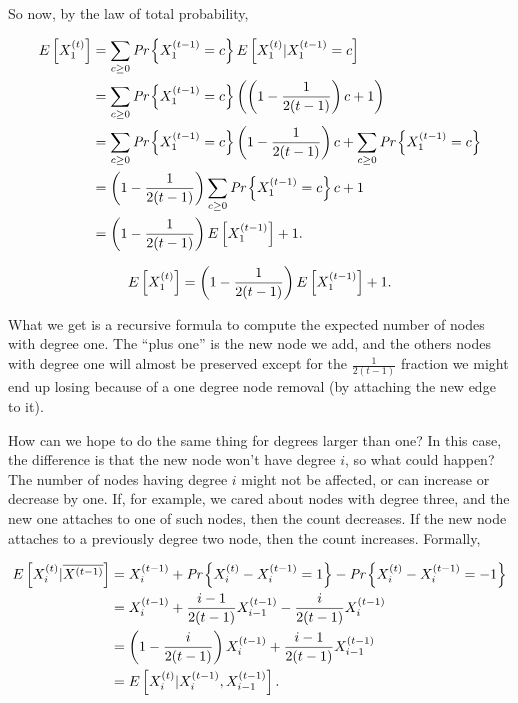So now, by the law of total probability,

\begin{align*}
E\left[X_1^{(t)}\right] &= \sum_{c \geq 0}\emph{Pr}\left\{X_1^{(t-1)} = c\right\}E\left[X_1^{(t)}|X_1^{(t-1)}=c\right]\\
&=\sum_{c \geq 0}\emph{Pr}\left\{X_1^{(t-1)}=c\right\}\left(\left(1-\frac{1}{2(t-1)}\right)c + 1\right)\\
&=\sum_{c \geq 0}\emph{Pr}\left\{X_1^{(t-1)}=c\right\}\left(1-\frac{1}{2(t-1)}\right)c +\sum_{c \geq 0}\emph{Pr}\left\{X_1^{(t-1)}=c\right\}\\
&=\left(1 - \frac{1}{2(t-1)}\right)\sum_{c \geq 0}\emph{Pr}\left\{X_1^{(t-1)} = c\right\}c + 1\\
&=\left(1 - \frac{1}{2(t-1)}\right)E\left[X_1^{(t-1)}\right] + 1.
\end{align*}

\begin{lem}\label{pa_lem1}
	\begin{equation}
		E\left[X_1^{(t)}\right] = \left(1 - \frac{1}{2(t-1)}\right)E\left[X_1^{(t-1)}\right] + 1.
	\end{equation}
\end{lem}

What we get is a recursive formula to compute the expected number of nodes with degree one. The ``plus one'' is the new node we add, and the others nodes with degree one will almost be preserved except for the $\frac{1}{2(t-1)}$ fraction we might end up losing because of a one degree node removal (by attaching the new edge to it).

How can we hope to do the same thing for degrees larger than one? In this case, the difference is that the new node won't have degree $i$, so what could happen? The number of nodes having degree $i$ might not be affected, or can increase or decrease by one. If, for example, we cared about nodes with degree three, and the new one attaches to one of such nodes, then the count decreases. If the new node attaches to a previously degree two node, then the count increases. Formally,

\begin{align*}
E\left[X_i^{(t)} | \overline{X^{(t-1)}}\right] &= X_i^{(t-1)} + \emph{Pr}\left\{X_i^{(t)} -X_i^{(t-1)} = 1\right\} - \emph{Pr}\left\{X_i^{(t)} -X_i^{(t-1)} = -1\right\}\\
&= X_i^{(t-1)} + \frac{i-1}{2(t-1)}X_{i-1}^{(t-1)} -\frac{i}{2(t-1)}X_i^{(t-1)}\\
&=\left(1 -\frac{i}{2(t-1)}\right)X_i^{(t-1)} + \frac{i-1}{2(t-1)}X_{i-1}^{(t-1)}\\
&=E\left[X_i^{(t)} | X_i^{(t-1)}, X_{i-1}^{(t-1)}\right].
\end{align*}

